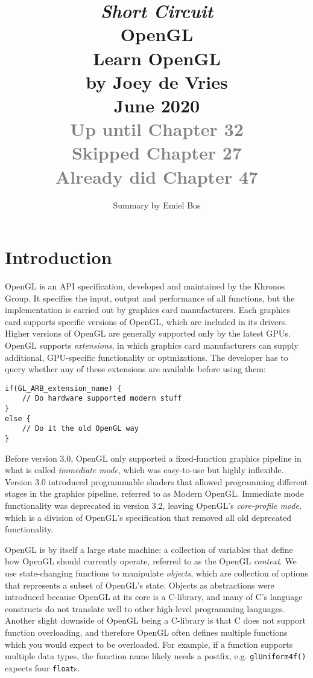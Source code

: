 \documentclass[8pt, table, xcdraw]{article}%
\title{
\textit{Short Circuit}\\
\vspace{15px}
\huge
OpenGL\\
\vspace{20px}
\large
Learn OpenGL\\
by Joey de Vries\\
June 2020\\
\textcolor{gray}{Up until Chapter 32\\Skipped Chapter 27\\Already did Chapter 47}
}
\author{Summary by Emiel Bos}
\date{}
\begin{document}
\maketitle

\section{Introduction} \label{intro}

OpenGL is an API specification, developed and maintained by the Khronos Group. It specifies the input, output and performance of all functions, but the implementation is carried out by graphics card manufacturers. Each graphics card supports specific versions of OpenGL, which are included in its drivers. Higher versions of OpenGL are generally supported only by the latest GPUs. OpenGL supports \emph{extensions}, in which graphics card manufacturers can supply additional, GPU-specific functionality or optmizations. The developer has to query whether any of these extensions are available before using them:

\begin{lstlisting}
if(GL_ARB_extension_name) {
    // Do hardware supported modern stuff
}
else {
    // Do it the old OpenGL way
}
\end{lstlisting}

Before version 3.0, OpenGL only supported a fixed-function graphics pipeline in what is called \emph{immediate mode}, which was easy-to-use but highly inflexible. Version 3.0 introduced programmable shaders that allowed programming different stages in the graphics pipeline, referred to as Modern OpenGL. Immediate mode functionality was deprecated in version 3.2, leaving OpenGL's \emph{core-profile mode}, which is a division of OpenGL's specification that removed all old deprecated functionality.

OpenGL is by itself a large state machine: a collection of variables that define how OpenGL should currently operate, referred to as the OpenGL \emph{context}. We use state-changing functions to manipulate \emph{objects}, which are collection of options that represents a subset of OpenGL's state. Objects as abstractions were introduced because OpenGL at its core is a C-library, and many of C's language constructs do not translate well to other high-level programming languages. Another slight downside of OpenGL being a C-library is that C does not support function overloading, and therefore OpenGL often defines multiple functions which you would expect to be overloaded. For example, if a function supports multiple data types, the function name likely needs a postfix, e.g. \lstinline{glUniform4f()} expects four \lstinline{float}s.
\end{document}
